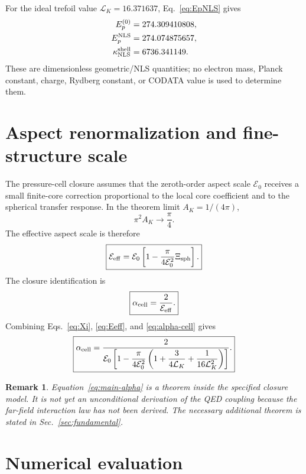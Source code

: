 \documentclass[11pt]{article}
\newcommand{\LK}{\mathcal L_K}
\newcommand{\Ezero}{\mathcal E_0}
\newcommand{\Eeff}{\mathcal E_{\rm eff}}
\newcommand{\Xisph}{\Xi_{\rm sph}}
\newcommand{\alphacell}{\alpha_{\rm cell}}
\newcommand{\EpNLS}{E_p^{\rm NLS}}
\newcommand{\kappaNLS}{\kappa_{\rm NLS}^{\rm shell}}
\newtheorem{remark}{Remark}
\begin{document}
For the ideal trefoil value \(\mathcal L_K=16.371637\), Eq.~\eqref{eq:EpNLS} gives
\begin{align}
  E_p^{(0)} &= 274.309410808,\\
  \EpNLS &= 274.074875657,\\
  \kappaNLS &= 6736.341149.
\end{align}
These are dimensionless geometric/NLS quantities; no electron mass, Planck constant, charge,
Rydberg constant, or CODATA value is used to determine them.

\section{Aspect renormalization and fine-structure scale}
\label{sec:aspect}

The pressure-cell closure assumes that the zeroth-order aspect scale \(\Ezero\) receives a
small finite-core correction proportional to the local core coefficient and to the spherical
transfer response.  In the theorem limit \(A_K=1/(4\pi)\),
\begin{equation}
  \pi^2 A_K\to\frac{\pi}{4}.
\end{equation}
The effective aspect scale is therefore
\begin{equation}
  \boxed{
  \Eeff
  =
  \Ezero
  \left[
  1-
  \frac{\pi}{4\Ezero^2}\Xisph
  \right].
  }
  \label{eq:Eeff}
\end{equation}
The closure identification is
\begin{equation}
  \boxed{
  \alphacell=\frac{2}{\Eeff}.
  }
  \label{eq:alpha-cell}
\end{equation}
Combining Eqs.~\eqref{eq:Xi}, \eqref{eq:Eeff}, and \eqref{eq:alpha-cell} gives
\begin{equation}
  \boxed{
  \alphacell
  =
  \frac{2}{
  \Ezero
  \left[
  1-\dfrac{\pi}{4\Ezero^2}
  \left(
  1+\dfrac{3}{4\LK}+\dfrac{1}{16\LK^2}
  \right)
  \right]
  }.
  }
  \label{eq:main-alpha}
\end{equation}

\begin{remark}
Equation~\eqref{eq:main-alpha} is a theorem inside the specified closure model.  It is not yet
an unconditional derivation of the QED coupling because the far-field interaction law has not
been derived.  The necessary additional theorem is stated in Sec.~\ref{sec:fundamental}.
\end{remark}

\section{Numerical evaluation}
\label{sec:numerical-evaluation}
\end{document}
